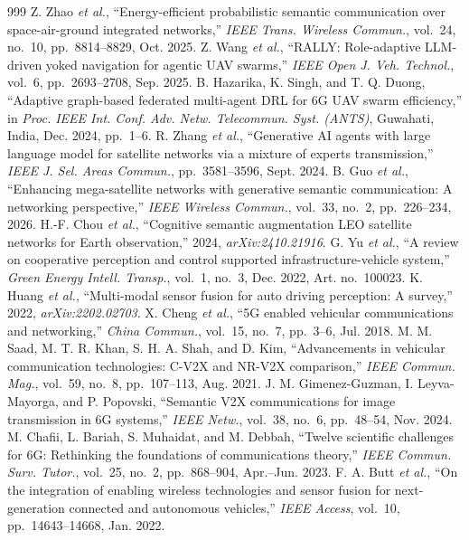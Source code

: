 \begin{thebibliography}{999}
 Z. Zhao \emph{et al.}, ``Energy-efficient probabilistic semantic communication over space-air-ground integrated networks,'' \emph{IEEE Trans. Wireless Commun.}, vol.~24, no.~10, pp.~8814--8829, Oct. 2025.
 Z. Wang \emph{et al.}, ``RALLY: Role-adaptive LLM-driven yoked navigation for agentic UAV swarms,'' \emph{IEEE Open J. Veh. Technol.}, vol.~6, pp.~2693--2708, Sep. 2025.
 B. Hazarika, K. Singh, and T. Q. Duong, ``Adaptive graph-based federated multi-agent DRL for 6G UAV swarm efficiency,'' in \emph{Proc. IEEE Int. Conf. Adv. Netw. Telecommun. Syst. (ANTS)}, Guwahati, India, Dec. 2024, pp.~1--6.
 R. Zhang \emph{et al.}, ``Generative AI agents with large language model for satellite networks via a mixture of experts transmission,'' \emph{IEEE J. Sel. Areas Commun.}, pp.~3581--3596, Sept. 2024.
 B. Guo \emph{et al.}, ``Enhancing mega-satellite networks with generative semantic communication: A networking perspective,'' \emph{IEEE Wireless Commun.}, vol.~33, no.~2, pp.~226--234, 2026.
 H.-F. Chou \emph{et al.}, ``Cognitive semantic augmentation LEO satellite networks for Earth observation,'' 2024, \emph{arXiv:2410.21916}.
 G. Yu \emph{et al.}, ``A review on cooperative perception and control supported infrastructure-vehicle system,'' \emph{Green Energy Intell. Transp.}, vol.~1, no.~3, Dec. 2022, Art. no.~100023.
 K. Huang \emph{et al.}, ``Multi-modal sensor fusion for auto driving perception: A survey,'' 2022, \emph{arXiv:2202.02703}.
 X. Cheng \emph{et al.}, ``5G enabled vehicular communications and networking,'' \emph{China Commun.}, vol.~15, no.~7, pp.~3--6, Jul. 2018.
 M. M. Saad, M. T. R. Khan, S. H. A. Shah, and D. Kim, ``Advancements in vehicular communication technologies: C-V2X and NR-V2X comparison,'' \emph{IEEE Commun. Mag.}, vol.~59, no.~8, pp.~107--113, Aug. 2021.
 J. M. Gimenez-Guzman, I. Leyva-Mayorga, and P. Popovski, ``Semantic V2X communications for image transmission in 6G systems,'' \emph{IEEE Netw.}, vol.~38, no.~6, pp.~48--54, Nov. 2024.
 M. Chafii, L. Bariah, S. Muhaidat, and M. Debbah, ``Twelve scientific challenges for 6G: Rethinking the foundations of communications theory,'' \emph{IEEE Commun. Surv. Tutor.}, vol.~25, no.~2, pp.~868--904, Apr.--Jun. 2023.
 F. A. Butt \emph{et al.}, ``On the integration of enabling wireless technologies and sensor fusion for next-generation connected and autonomous vehicles,'' \emph{IEEE Access}, vol.~10, pp.~14643--14668, Jan. 2022.

\end{thebibliography}
